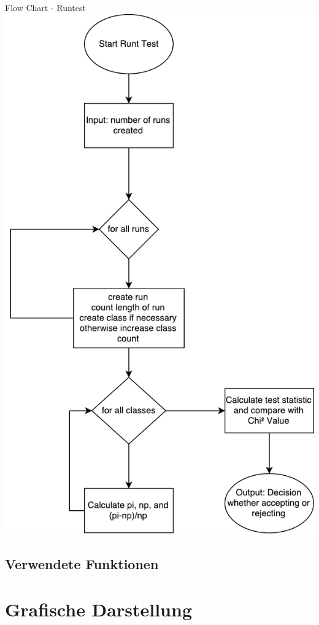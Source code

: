 \begin{frame}{Flow Chart - Runtest}
	\centering
  	\includegraphics[scale=0.24]{BSP25_RuntestFlowChart.pdf}
\end{frame}

\subsection{Verwendete Funktionen}
%

\section{Grafische Darstellung}


